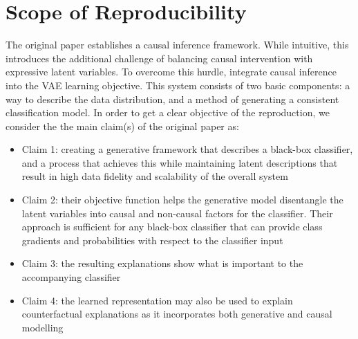 \section{Scope of Reproducibility}\label{sec:claims}

The original paper establishes a causal inference framework. While intuitive, this introduces the additional challenge of balancing causal intervention with expressive latent variables. To overcome this hurdle, \cite{oshaughnessy2020generative} integrate causal inference into the VAE learning objective. This system consists of two basic components: a way to describe the data distribution, and a method of generating a consistent classification model. In order to get a clear objective of the reproduction, we consider the the main claim(s) of the original paper as:

\begin{itemize}
	\item Claim 1: creating a generative framework that describes a black-box classifier, and a process that achieves this while maintaining latent descriptions that result in high data fidelity and scalability of the overall system
	\item Claim 2: their objective function helps the generative model disentangle the latent variables into causal and non-causal factors for the classifier. Their approach is sufficient for any black-box classifier that can provide class gradients and probabilities with respect to the classifier input
	\item Claim 3: the resulting explanations show what is important to the accompanying classifier %
	\item Claim 4: the learned representation may also be used to explain counterfactual explanations as it incorporates both generative and causal modelling %
\end{itemize}

